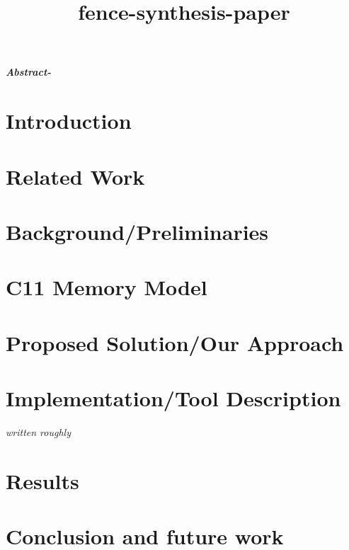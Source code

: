 \documentclass{article}
\title{fence-synthesis-paper}
\date{}
\newcommand{\ishComment}[1]{\textit{\color{red}\tiny{#1}}}
\begin{document}
\maketitle
\textit{\textbf{Abstract-}}

\section{Introduction} \label{sec:intro}


\section{Related Work} \label{sec:related}


\section{Background/Preliminaries} \label{sec:prelim}


\section{C11 Memory Model} \label{sec:c11 model}


\section{Proposed Solution/Our Approach}\label{sec:approach}


\section{Implementation/Tool Description}
\ishComment{written roughly}


\section{Results}

\section{Conclusion and future work}



\end{document}
